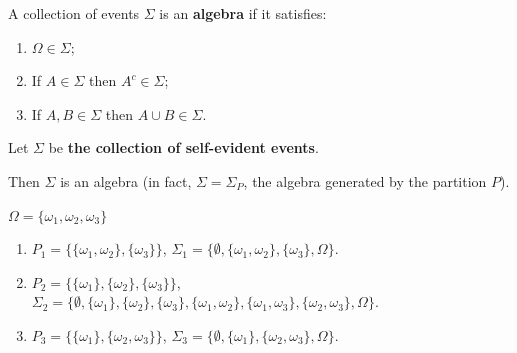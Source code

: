 \documentclass[11pt]{elegantbook}
\begin{document}
\begin{definition}[Algebra]
    \normalfont
    A collection of events $\Sigma$ is an \textbf{algebra} if it satisfies:
    \begin{enumerate}
        \item $\Omega\in\Sigma$;
        \item If $A\in\Sigma$ then $A^c\in\Sigma$;
        \item If $A,B\in\Sigma$ then $A\cup B\in\Sigma$.
    \end{enumerate}
\end{definition}
Let $\Sigma$ be \textbf{the collection of self-evident events}.
\begin{corollary}
    Then $\Sigma$ is an algebra (in fact, $\Sigma = \Sigma_P$, the algebra generated by the partition $P$).
\end{corollary}

\begin{example}
    $\Omega=\{\omega_1,\omega_2,\omega_3\}$
    \begin{enumerate}
        \item $P_1=\{\{\omega_1,\omega_2\},\{\omega_3\}\}$, $\Sigma_1=\{\emptyset,\{\omega_1,\omega_2\},\{\omega_3\},\Omega\}$.
        \item $P_2=\{\{\omega_1\},\{\omega_2\},\{\omega_3\}\}$, $\Sigma_2=\{\emptyset,\{\omega_1\},\{\omega_2\},\{\omega_3\},\{\omega_1,\omega_2\},\{\omega_1,\omega_3\},\{\omega_2,\omega_3\},\Omega\}$.
        \item $P_3=\{\{\omega_1\},\{\omega_2,\omega_3\}\}$, $\Sigma_3=\{\emptyset,\{\omega_1\},\{\omega_2,\omega_3\},\Omega\}$.
    \end{enumerate}
\end{example}
\end{document}
